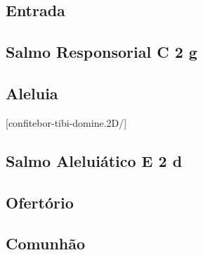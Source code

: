 
\subsection{Entrada}\label{subsection:tempus-per-annum/missa-2/introitus}

\subsection[Salmo Responsorial]{Salmo Responsorial \textmd{C 2 g}}\label{subsection:tempus-per-annum/missa-2/psalmus-responsorius}

\AllowPageFlush

\subsection{Aleluia}\label{subsection:tempus-per-annum/missa-2/alleluia}
[confitebor-tibi-domine.2D/]

\subsection[Salmo Aleluiático]{Salmo Aleluiático \textmd{E 2 d}}\label{subsection:tempus-per-annum/missa-2/psalmus-alleluiaticus}

\AllowPageFlush

\subsection{Ofertório}\label{subsection:tempus-per-annum/missa-2/offertorium}

\subsection{Comunhão}\label{subsection:tempus-per-annum/missa-2/communio}
